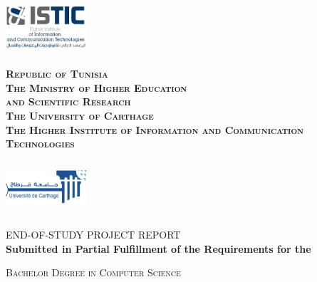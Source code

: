 \begin{titlepage}

\newcommand{\HRule}{\rule{\linewidth}{0.5mm}} %

\center %
 


\begin{minipage}[l]{0.2\columnwidth}
\includegraphics[width=3cm,height=2cm]{assets/logo_istic.jpg}\\
\end{minipage}
\hfill
\begin{minipage}[l]{0.5\columnwidth}
\centering
\footnotesize
\textbf{\textsc{Republic of Tunisia}}\\
\textbf{\textsc{The Ministry of Higher Education \\
and Scientific Research}}\\
\medskip 
\textbf{\textsc{The University of Carthage}}\\
\medskip 
\textbf{\textsc{The Higher Institute of Information and Communication Technologies}}
\end{minipage}
\hfill
\begin{minipage}[l]{0.2\columnwidth}
\includegraphics[width=3cm,height=2cm]{assets/logo_ucar.jpg}\\
\end{minipage}

\vskip1cm
\textsc{\large END-OF-STUDY PROJECT REPORT}\\[0.5cm] %

\textbf{Submitted in Partial Fulfillment of the  Requirements for the  }

\textsc{\large Bachelor Degree in Computer Science
}\\[0.5cm] %


\end{titlepage}
